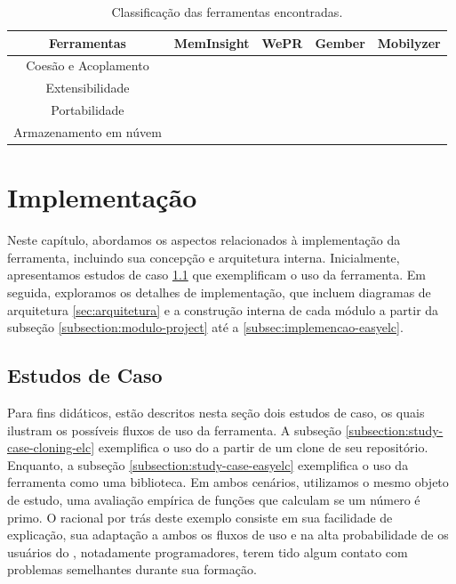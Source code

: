 \documentclass[12pt]{tcc}
\newcommand{\cmark}{\ding{51}}
\newcommand{\xmark}{\ding{55}}
\begin{document}
	\begin{table}[ht]
	\caption{Classificação das ferramentas encontradas.} %
	\centering %
	\begin{tabular}{c c c c c } %
	\toprule %

	\textbf{Ferramentas} &\textbf{MemInsight} & \textbf{WePR} & \textbf{Gember} & \textbf{Mobilyzer}  \\ [0.4ex]

	\midrule %
	Coesão e Acoplamento & \cmark & \cmark & \cmark & \cmark   \\
	Extensibilidade & \xmark & \xmark & \xmark & \xmark  \\
	Portabilidade & \cmark & \xmark & \xmark & \xmark  \\
	Armazenamento em núvem & \xmark & \cmark & \cmark & \cmark  \\
	\bottomrule %
	\end{tabular}
	\label{table:classificacao-sem-elc} %
	\end{table}
\chapter{Implementação}
	\label{cap:implementação}


	Neste capítulo, abordamos os aspectos relacionados à implementação da ferramenta, incluindo sua concepção e arquitetura interna.
	Inicialmente, apresentamos estudos de caso \ref{sec:estudos-de-caso} que exemplificam o uso da ferramenta.
	Em seguida, exploramos os detalhes de implementação, que incluem diagramas de arquitetura \ref{sec:arquitetura} e a construção interna de cada módulo a partir da subseção \ref{subsection:modulo-project} até a \ref{subsec:implemencao-easyelc}.

	\section{Estudos de Caso}
	\label{sec:estudos-de-caso}

	Para fins didáticos, estão descritos nesta seção dois estudos de caso, os quais ilustram os possíveis fluxos de uso da ferramenta.
	A subseção \ref{subsection:study-case-cloning-elc} exemplifica o uso do  a partir de um clone de seu repositório.
	Enquanto, a subseção \ref{subsection:study-case-easyelc} exemplifica o uso da ferramenta como uma biblioteca. 
	Em ambos cenários, utilizamos o mesmo objeto de estudo, uma avaliação empírica de funções que calculam se um número é primo.
	O racional por trás deste exemplo consiste em sua facilidade de explicação, sua adaptação a ambos os fluxos de uso e na alta probabilidade de os usuários do , notadamente programadores, terem tido algum contato com problemas semelhantes durante sua formação.
\end{document}
